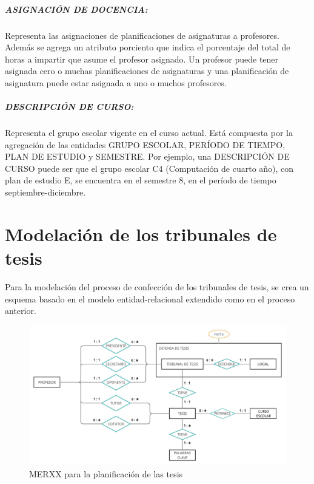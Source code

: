 


\subparagraph{ASIGNACIÓN DE DOCENCIA:}
Representa las asignaciones de planificaciones de asignaturas a profesores.
Además se agrega un atributo porciento que indica el porcentaje del total de horas 
a impartir que asume el profesor asignado. Un profesor puede 
tener asignada cero o muchas planificaciones de asignaturas y una planificación de 
asignatura puede estar asignada a uno o muchos profesores.


\subparagraph{DESCRIPCIÓN DE CURSO:}
Representa el grupo escolar vigente en el curso actual. Está 
compuesta por la agregación de las entidades GRUPO ESCOLAR,
PERÍODO DE TIEMPO, PLAN DE ESTUDIO y SEMESTRE.  
Por ejemplo, una DESCRIPCIÓN DE CURSO puede ser 
que el grupo escolar C4 (Computación de cuarto año), con plan de
estudio E, se encuentra en el semestre 8,  en el período de tiempo septiembre-diciembre.






\section{Modelación de los tribunales de tesis}\label{database:planificación-tesis}
Para la modelación del proceso de confección de los tribunales de tesis,
se crea un esquema basado en el modelo entidad-relacional extendido como en el 
proceso anterior. 


\begin{figure}[H]
    \includegraphics[scale=0.31]{Graphics/Database/MERXX-TC-FINAL.png}
    \caption{MERXX para la planificación de las tesis}
    \label{mern-ta}
\end{figure}



